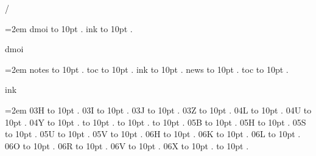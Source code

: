 
\parindent=0pt
\pdfpagewidth=148mm
\pdfpageheight=210mm
\hsize=128mm
\vsize=190mm
\pdfhorigin=0pt
\pdfvorigin=0pt
\hoffset=10mm
\voffset=10mm
/
\par\begingroup
\leftskip=2em
\smallskip
dmoi \leaders\hbox to 10pt {\hss.\hss}  \hfill {}
\smallskip
ink \leaders\hbox to 10pt {\hss.\hss}  \hfill {}
\smallskip
\medskip
\par\endgroup
\bigskip
{}
dmoi
\par\begingroup
\leftskip=2em
\smallskip
notes \leaders\hbox to 10pt {\hss.\hss}  \hfill {}
\smallskip
toc \leaders\hbox to 10pt {\hss.\hss}  \hfill {}
\smallskip
\medskip
ink \leaders\hbox to 10pt {\hss.\hss}  \hfill {}
\smallskip
news \leaders\hbox to 10pt {\hss.\hss}  \hfill {}
\smallskip
toc \leaders\hbox to 10pt {\hss.\hss}  \hfill {}
\smallskip
\par\endgroup
\bigskip
{}
ink
\par\begingroup
\leftskip=2em
\smallskip
\medskip
03H \leaders\hbox to 10pt {\hss.\hss}  \hfill {}
\smallskip
03I \leaders\hbox to 10pt {\hss.\hss}  \hfill {}
\smallskip
03J \leaders\hbox to 10pt {\hss.\hss}  \hfill {}
\smallskip
03Z \leaders\hbox to 10pt {\hss.\hss}  \hfill {}
\smallskip
04L \leaders\hbox to 10pt {\hss.\hss}  \hfill {}
\smallskip
04U \leaders\hbox to 10pt {\hss.\hss}  \hfill {}
\smallskip
04Y \leaders\hbox to 10pt {\hss.\hss}  \hfill {}
 \leaders\hbox to 10pt {\hss.\hss}  \hfill {}
 \leaders\hbox to 10pt {\hss.\hss}  \hfill {}
 \leaders\hbox to 10pt {\hss.\hss}  \hfill {}
\smallskip
05B \leaders\hbox to 10pt {\hss.\hss}  \hfill {}
\smallskip
05H \leaders\hbox to 10pt {\hss.\hss}  \hfill {}
\smallskip
05S \leaders\hbox to 10pt {\hss.\hss}  \hfill {}
\smallskip
05U \leaders\hbox to 10pt {\hss.\hss}  \hfill {}
\smallskip
05V \leaders\hbox to 10pt {\hss.\hss}  \hfill {}
\smallskip
06H \leaders\hbox to 10pt {\hss.\hss}  \hfill {}
\smallskip
06K \leaders\hbox to 10pt {\hss.\hss}  \hfill {}
\smallskip
06L \leaders\hbox to 10pt {\hss.\hss}  \hfill {}
\smallskip
06O \leaders\hbox to 10pt {\hss.\hss}  \hfill {}
\smallskip
06R \leaders\hbox to 10pt {\hss.\hss}  \hfill {}
\smallskip
06V \leaders\hbox to 10pt {\hss.\hss}  \hfill {}
\smallskip
06X \leaders\hbox to 10pt {\hss.\hss}  \hfill {}
 \leaders\hbox to 10pt {\hss.\hss}  \hfill {}
